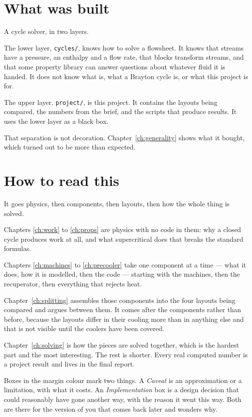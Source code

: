 \documentclass[11pt,a4paper]{report}
\newcommand{\code}[1]{\texttt{\small #1}}
\begin{document}
\section{What was built}

A cycle solver, in two layers.

The lower layer, \code{cycles/}, knows how to solve a flowsheet. It knows
that streams have a pressure, an enthalpy and a flow rate, that blocks
transform streams, and that some property library can answer questions about
whatever fluid it is handed. It does not know what  is, what a
Brayton cycle is, or what this project is for.

The upper layer, \code{project/}, is this project. It contains the layouts
being compared, the numbers from the brief, and the scripts that produce
results. It uses the lower layer as a black box.

That separation is not decoration. Chapter~\ref{ch:generality} shows what it
bought, which turned out to be more than expected.

\section{How to read this}

It goes physics, then components, then layouts, then how the whole thing is
solved.

Chapters \ref{ch:work} to \ref{ch:props} are physics with no code in them:
why a closed cycle produces work at all, and what supercritical 
does that breaks the standard formulas.

Chapters \ref{ch:machines} to \ref{ch:precooler} take one component at a
time --- what it does, how it is modelled, then the code --- starting with
the machines, then the recuperator, then everything that rejects heat.

Chapter~\ref{ch:splitting} assembles those components into the four layouts
being compared and argues between them. It comes after the components
rather than before, because the layouts differ in their cooling more than
in anything else and that is not visible until the coolers have been
covered.

Chapter~\ref{ch:solving} is how the pieces are solved together, which is the
hardest part and the most interesting. The rest is shorter. Every real
computed number is a project result and lives in the final report.

Boxes in the margin colour mark two things. A \emph{Caveat} is an
approximation or a limitation, with what it costs. An \emph{Implementation}
box is a design decision that could reasonably have gone another way, with
the reason it went this way. Both are there for the version of you that
comes back later and wonders why.
\end{document}
